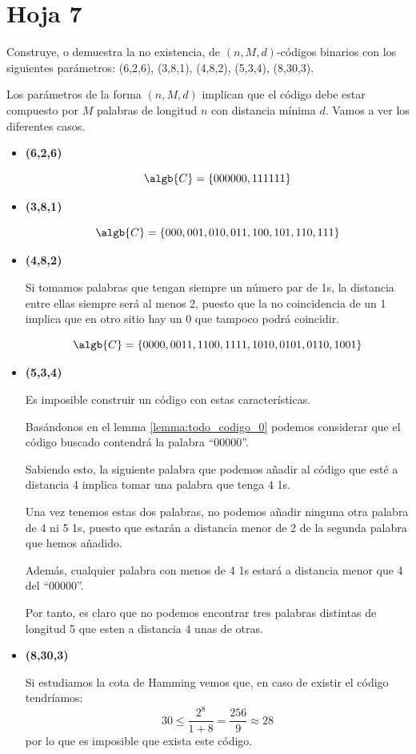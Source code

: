 \section{Hoja 7}
\begin{problem}[1]
Construye, o demuestra la no existencia, de
$(n,M,d)$-códigos binarios con los siguientes parámetros: (6,2,6),
(3,8,1), (4,8,2), (5,3,4), (8,30,3).
\solution


Los parámetros de la forma $(n,M,d)$ implican que el código debe estar compuesto por $M$ palabras de longitud $n$ con distancia mínima $d$. Vamos a ver los diferentes casos.

\begin{itemize}
\item \textbf{(6,2,6)}

\[\algb{C} = \{000000,111111 \}\]

\item \textbf{(3,8,1)}

\[\algb{C} = \{000,001,010,011,100,101,110,111 \}\]

\item \textbf{(4,8,2)}

Si tomamos palabras que tengan siempre un número par de 1s, la distancia entre ellas siempre será al menos 2, puesto que la no coincidencia de un 1 implica que en otro sitio hay un 0 que tampoco podrá coincidir.

\[\algb{C} = \{0000,0011,1100,1111,1010,0101,0110,1001 \}\]

\item \textbf{(5,3,4)}

Es imposible construir un código con estas características.

Basándonos en el lemma \ref{lemma:todo_codigo_0} podemos considerar que el código buscado contendrá la palabra ``00000''.

Sabiendo esto, la siguiente palabra que podemos añadir al código que esté a distancia 4 implica tomar una palabra que tenga 4 1s.

Una vez tenemos estas dos palabras, no podemos añadir ninguna otra palabra de 4 ni 5 1s, puesto que estarán a distancia menor de 2 de la segunda palabra que hemos añadido.

Además, cualquier palabra con menos de 4 1s estará a distancia menor que 4 del ``00000''.

Por tanto, es claro que no podemos encontrar tres palabras distintas de longitud 5 que esten a distancia 4 unas de otras.

\item \textbf{(8,30,3)}

Si estudiamos la cota de Hamming vemos que, en caso de existir el código tendríamos:
\[30 \leq \frac{2^8}{1+8}=\frac{256}{9} \approx 28 \]
por lo que es imposible que exista este código.

\end{itemize}

\end{problem}

